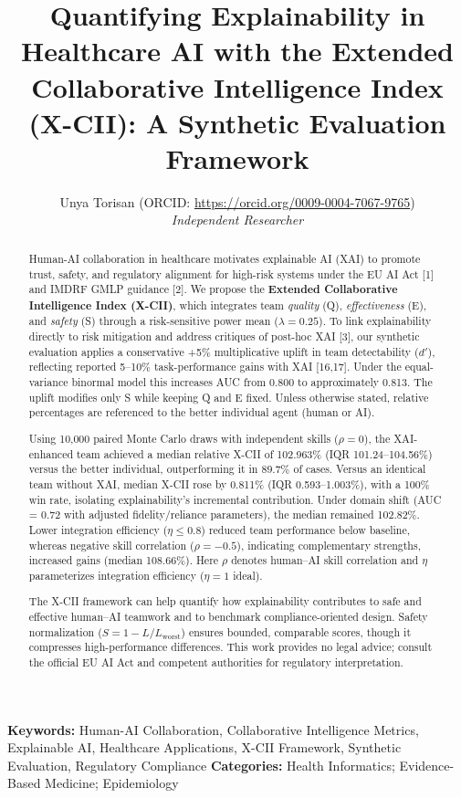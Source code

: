 \documentclass[11pt,a4paper]{article}
\title{\textbf{Quantifying Explainability in Healthcare AI with the Extended Collaborative Intelligence Index (X-CII): A Synthetic Evaluation Framework}}
\author{Unya Torisan (ORCID: \href{https://orcid.org/0009-0004-7067-9765}{https://orcid.org/0009-0004-7067-9765}) \\
        \small\textit{Independent Researcher}}
\date{}
\begin{document}
\maketitle
\begin{abstract}
Human-AI collaboration in healthcare motivates explainable AI (XAI) to promote trust, safety, and regulatory alignment for high-risk systems under the EU AI Act [1] and IMDRF GMLP guidance [2]. We propose the \textbf{Extended Collaborative Intelligence Index (X-CII)}, which integrates team \textit{quality} (Q), \textit{effectiveness} (E), and \textit{safety} (S) through a risk-sensitive power mean ($\lambda = 0.25$). To link explainability directly to risk mitigation and address critiques of post-hoc XAI [3], our synthetic evaluation applies a conservative +5\% multiplicative uplift in team detectability ($d'$), reflecting reported 5--10\% task-performance gains with XAI [16,17]. Under the equal-variance binormal model this increases AUC from 0.800 to approximately 0.813. The uplift modifies only S while keeping Q and E fixed. Unless otherwise stated, relative percentages are referenced to the better individual agent (human or AI).

Using 10,000 paired Monte Carlo draws with independent skills ($\rho = 0$), the XAI-enhanced team achieved a median relative X-CII of 102.963\% (IQR 101.24--104.56\%) versus the better individual, outperforming it in 89.7\% of cases. Versus an identical team without XAI, median X-CII rose by 0.811\% (IQR 0.593--1.003\%), with a 100\% win rate, isolating explainability's incremental contribution. Under domain shift (AUC = 0.72 with adjusted fidelity/reliance parameters), the median remained 102.82\%. Lower integration efficiency ($\eta \le 0.8$) reduced team performance below baseline, whereas negative skill correlation ($\rho = -0.5$), indicating complementary strengths, increased gains (median 108.66\%). Here $\rho$ denotes human–AI skill correlation and $\eta$ parameterizes integration efficiency ($\eta = 1$ ideal).

The X-CII framework can help quantify how explainability contributes to safe and effective human–AI teamwork and to benchmark compliance-oriented design. Safety normalization ($S = 1 - L / L_{\text{worst}}$) ensures bounded, comparable scores, though it compresses high-performance differences.  
This work provides no legal advice; consult the official EU AI Act and competent authorities for regulatory interpretation.
\end{abstract}
\noindent\textbf{Keywords:} Human-AI Collaboration, Collaborative Intelligence Metrics, Explainable AI, Healthcare Applications, X-CII Framework, Synthetic Evaluation, Regulatory Compliance
\noindent\textbf{Categories:} Health Informatics; Evidence-Based Medicine; Epidemiology
\vspace{1em}
\end{document}
